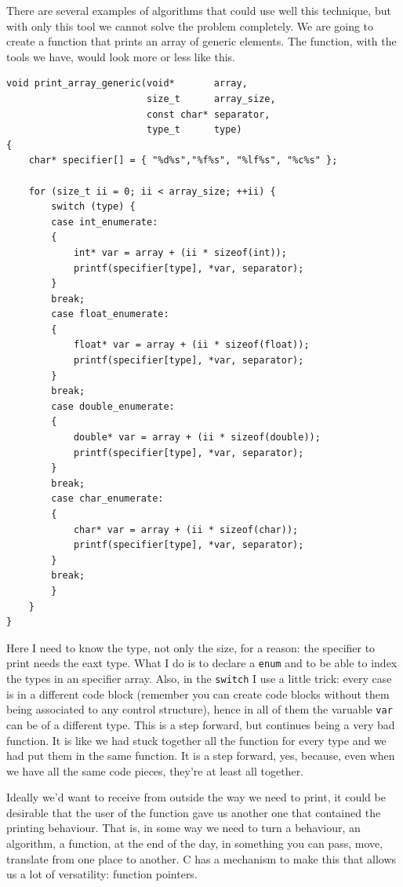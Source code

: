 \documentclass[a4paper]{article}
\begin{document}
There are several examples of algorithms that could use well this technique, but
with only this tool we cannot solve the problem completely. We are going to
create a function that prints an array of generic elements. The function, with
the tools we have, would look more or less like this.

\noindent
\begin{minipage}[H]{\linewidth}
\mbox{}
\begin{lstlisting}[style=C,
caption={Print arrays of several types},
label={lst:genericPrintf}]
void print_array_generic(void*       array,
                         size_t      array_size,
                         const char* separator,
                         type_t      type)
{
    char* specifier[] = { "%d%s","%f%s", "%lf%s", "%c%s" };

    for (size_t ii = 0; ii < array_size; ++ii) {
        switch (type) {
        case int_enumerate:
        {
            int* var = array + (ii * sizeof(int));
            printf(specifier[type], *var, separator);
        }
        break;
        case float_enumerate:
        {
            float* var = array + (ii * sizeof(float));
            printf(specifier[type], *var, separator);
        }
        break;
        case double_enumerate:
        {
            double* var = array + (ii * sizeof(double));
            printf(specifier[type], *var, separator);
        }
        break;
        case char_enumerate:
        {
            char* var = array + (ii * sizeof(char));
            printf(specifier[type], *var, separator);
        }
        break;
        }
    }
}
\end{lstlisting}
\end{minipage}

Here I need to know the type, not only the size, for a reason: the specifier
to print needs the eaxt type. What I do is to declare a \verb!enum! and to be
able to index the types in an specifier array. Also, in the \verb!switch! I use
a little trick: every case is in a different code block (remember you can create
code blocks without them being associated to any control structure), hence in
all of them the varuable \verb!var! can be of a different type. This is a step
forward, but continues being a very bad function. It is like we had stuck
together all the function for every type and we had put them in the same
function.  It is a step forward, yes, because, even when we have all the same
code pieces, they're at least all together.

Ideally we'd want to receive from outside the way we need to print, it could
be desirable that the user of the function gave us another one that contained
the printing behaviour. That is, in some way we need to turn a behaviour,
an algorithm, a function, at the end of the day, in something you can pass,
move, translate from one place to another. C has a mechanism to make this that
allows us a lot of versatility: function pointers.
\end{document}
